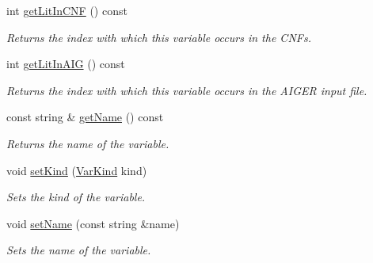 \begin{DoxyCompactItemize}
int \hyperlink{classVarInfo_aefe8fc94158fe9e4d05c091176f14232}{get\-Lit\-In\-C\-N\-F} () const 
\begin{DoxyCompactList}\small\item\em Returns the index with which this variable occurs in the C\-N\-Fs. \end{DoxyCompactList}\item 
int \hyperlink{classVarInfo_ae3d28b77b1310b015c82774a08af4d94}{get\-Lit\-In\-A\-I\-G} () const 
\begin{DoxyCompactList}\small\item\em Returns the index with which this variable occurs in the A\-I\-G\-E\-R input file. \end{DoxyCompactList}\item 
const string \& \hyperlink{classVarInfo_a98fdcef8b931d3973365047c245085e3}{get\-Name} () const 
\begin{DoxyCompactList}\small\item\em Returns the name of the variable. \end{DoxyCompactList}\item 
void \hyperlink{classVarInfo_abe5617dbfaf5778b4f4d24c58177f950}{set\-Kind} (\hyperlink{classVarInfo_a64d1da76cf84fe674e5fef9764ef11cf}{Var\-Kind} kind)
\begin{DoxyCompactList}\small\item\em Sets the kind of the variable. \end{DoxyCompactList}\item 
void \hyperlink{classVarInfo_a8c34d435c8364a03a2002a01fa5424e6}{set\-Name} (const string \&name)
\begin{DoxyCompactList}\small\item\em Sets the name of the variable. \end{DoxyCompactList}\end{DoxyCompactItemize}
